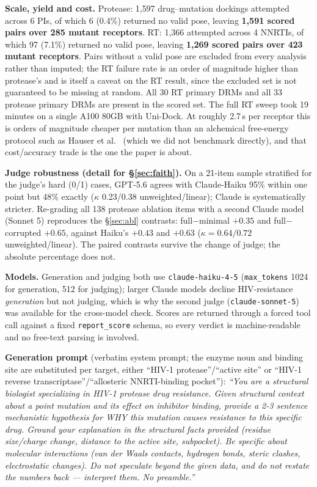 \documentclass{article}
\begin{document}
\textbf{Scale, yield and cost.} Protease: 1{,}597 drug--mutation dockings
attempted across 6 PIs, of which 6 (0.4\%) returned no valid pose, leaving
\textbf{1{,}591 scored pairs over 285 mutant receptors}. RT: 1{,}366 attempted
across 4 NNRTIs, of which 97 (7.1\%) returned no valid pose, leaving
\textbf{1{,}269 scored pairs over 423 mutant receptors}. Pairs without a valid
pose are excluded from every analysis rather than imputed; the RT failure rate is
an order of magnitude higher than protease's and is itself a caveat on the RT
result, since the excluded set is not guaranteed to be missing at random. All 30
RT primary DRMs and all 33 protease primary DRMs are present in the scored set.
The full RT sweep took 19 minutes on a single A100 80GB with Uni-Dock. At roughly
2.7\,s per receptor this is orders of magnitude cheaper per mutation than an
alchemical free-energy protocol such as Hauser et al.~\citep{hauser2018} (which we
did not benchmark directly), and that cost/accuracy trade is the one the paper is
about.

\textbf{Judge robustness (detail for \S\ref{sec:faith}).} On a 21-item sample
stratified for the judge's hard (0/1) cases, GPT-5.6 agrees with Claude-Haiku
95\% within one point but 48\% exactly ($\kappa$ 0.23/0.38 unweighted/linear);
Claude is systematically stricter. Re-grading all 138 protease ablation items
with a second Claude model (Sonnet 5) reproduces the \S\ref{sec:abl} contrasts:
full$-$minimal $+0.35$ and full$-$corrupted $+0.65$, against Haiku's $+0.43$ and
$+0.63$ ($\kappa=0.64/0.72$ unweighted/linear). The paired contrasts survive the
change of judge; the absolute percentage does not.

\textbf{Models.} Generation and judging both use \texttt{claude-haiku-4-5}
(\texttt{max\_tokens} 1024 for generation, 512 for judging); larger Claude models
decline HIV-resistance \emph{generation} but not judging, which is why the second
judge (\texttt{claude-sonnet-5}) was available for the cross-model check. Scores
are returned through a forced tool call against a fixed \texttt{report\_score}
schema, so every verdict is machine-readable and no free-text parsing is involved.

\textbf{Generation prompt} (verbatim system prompt; the enzyme noun and binding
site are substituted per target, either ``HIV-1 protease''/``active site'' or ``HIV-1
reverse transcriptase''/``allosteric NNRTI-binding pocket''): \emph{``You are a
structural biologist specializing in HIV-1 protease drug resistance. Given
structural context about a point mutation and its effect on inhibitor binding,
provide a 2-3 sentence mechanistic hypothesis for WHY this mutation causes
resistance to this specific drug. Ground your explanation in the structural facts
provided (residue size/charge change, distance to the active site, subpocket). Be
specific about molecular interactions (van der Waals contacts, hydrogen bonds,
steric clashes, electrostatic changes). Do not speculate beyond the given data,
and do not restate the numbers back --- interpret them. No preamble.''}
\end{document}

